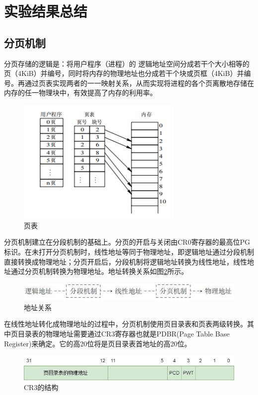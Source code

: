 \documentclass[UTF8,12pt]{ctexart}
\begin{document}
    \section{实验结果总结}
    \subsection{分页机制}
    分页存储的逻辑是：将用户程序（进程）的 逻辑地址空间分成若干个大小相等的页（4KiB）并编号，同时将内存的物理地址也分成若干个块或页框（4KiB）并编号。再通过页表实现两者的一一映射关系，从而实现将进程的各个页离散地存储在内存的任一物理块中，有效提高了内存的利用率。
    \begin{figure}[H]
        \centering
        \includegraphics[width=8cm]{images/页表.png}
        \caption{页表}
        \label{页表}
    \end{figure}
    
    分页机制建立在分段机制的基础上。分页的开启与关闭由CR0寄存器的最高位PG标识。在未打开分页机制时，线性地址等同于物理地址，即逻辑地址通过分段机制直接转换成物理地址；分页开启后，分段机制将逻辑地址转换为线性地址，线性地址通过分页机制转换为物理地址。地址转换关系如图\ref{地址关系}所示。
    \begin{figure}[H]
        \centering
        \includegraphics[width=12cm]{images/地址关系.png}
        \caption{地址关系}
        \label{地址关系}
    \end{figure}
    
    在线性地址转化成物理地址的过程中，分页机制使用页目录表和页表两级转换。其中页目录表的物理地址需要通过CR3寄存器也就是PDBR(Page Table Base Register)来确定。它的高20位将是页目录表首地址的高20位。
    \begin{figure}[H]
        \centering
        \includegraphics[width=12cm]{images/CR3.png}
        \caption{CR3的结构}
        \label{CR3结构}
    \end{figure}
    
\end{document}

